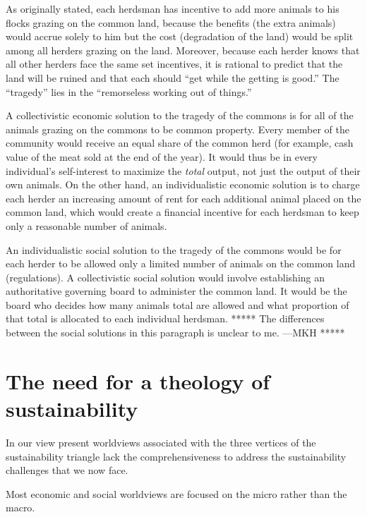 \documentclass[12pt]{article}
\begin{document}
As originally stated, each herdsman has incentive 
to add more animals to his flocks grazing on the common land, because
the benefits (the extra animals) would accrue solely to him
but the cost (degradation of the land) 
would be split among all herders grazing on the land. 
Moreover, because each herder knows that all other herders face the same set incentives, 
it is rational to predict that the land will be ruined
and that each should ``get while the getting is good.''
The ``tragedy'' lies in the ``remorseless working out of things.''

A collectivistic economic solution to the tragedy of the commons 
is for all of the animals grazing on the commons to be common property. 
Every member of the community would receive an equal share of the common herd 
(for example, cash value of the meat sold at the end of the year). 
It would thus be in every individual's self-interest 
to maximize the \emph{total} output, 
not just the output of their own animals. 
On the other hand, 
an individualistic economic solution is to charge each herder an increasing amount of rent 
for each additional animal placed on the common land, 
which would create a financial incentive for each herdsman to keep
only a reasonable number of animals. 

An individualistic social solution to the tragedy of the commons 
would be for each herder to be allowed
only a limited number of animals on the common land (regulations). 
A collectivistic social solution would involve establishing 
an authoritative governing board
to administer the common land. 
It would be the board who decides how many animals total are allowed and what proportion
of that total is allocated to each individual herdsman.
***** The differences between the social solutions 
in this paragraph is unclear to me. ---MKH *****


\section{The need for a theology of sustainability}
\label{sec:need_for_theology_of_sustainability}

In our view present worldviews associated with the three vertices of the sustainability triangle 
lack the comprehensiveness to address the sustainability challenges that we now face. 


Most economic and social worldviews are focused on the micro rather than the macro.
\end{document}
